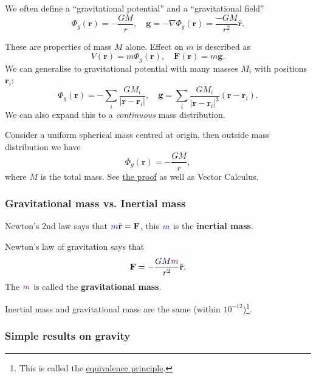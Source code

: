 \begin{definition}
    We often define a ``gravitational potential'' and a ``gravitational field''
\[
    \Phi_g(\mathbf{r}) = -\frac{GM}{r},\quad \mathbf{g} = - \nabla \Phi_g(\mathbf{r}) = \frac{-GM}{r^2}\hat{\mathbf{r}}.
\]
\end{definition}
These are properties of mass $M$ alone. Effect on $m$ is described as
\[
    V(\mathbf{r}) = m\Phi_g(\mathbf{r}),\quad \mathbf{F}(\mathbf{r}) = m\mathbf{g}.
\]
We can generalise to gravitational potential with many masses $M_i$ with positions $ \mathbf{r}_i $:
\[
    \Phi_g(\mathbf{r}) = -\sum_{i} \frac{GM_i}{|\mathbf{r}-\mathbf{r}_i|},\quad \mathbf{g} = \sum_i \frac{GM_i}{|\mathbf{r}-\mathbf{r}_i|^3}(\mathbf{r}-\mathbf{r}_i).
\]
We can also expand this to a \textit{continuous} mass distribution.
\begin{example}
    Consider a uniform spherical mass centred at origin, then outside mass distribution we have 
    \[
        \Phi_g(\mathbf{r}) = -\frac{GM}{r},
    \]
    where $M$ is the total mass. See \href{http://www.damtp.cam.ac.uk/user/tong/relativity/dynrel.pdf#page=29}{the proof} as well as Vector Calculus.
\end{example}

\subsubsection*{Gravitational mass vs. Inertial mass}
\begin{definition}
    Newton's 2nd law says that $ {\color{blue}m} \ddot{\mathbf{r}}=\mathbf{F} $, this ${\color{blue}m}$ is the \textbf{inertial mass}.
\end{definition}
\begin{definition}
    Newton's law of gravitation says that 
    \[
        \mathbf{F} = -\frac{GM{\color{violet}m}}{r^2}\hat{\mathbf{r}}.
    \]
    The ${\color{violet}m}$ is called the \textbf{gravitational mass}.
\end{definition}

\begin{proposition}
    Inertial mass and gravitational mass are the same (within $ 10^{-12} $)\footnote{This is called the \href{http://www.damtp.cam.ac.uk/user/tong/gr/gr.pdf\#page=26}{equivalence principle}.}.
\end{proposition}

\subsubsection*{Simple results on gravity}

